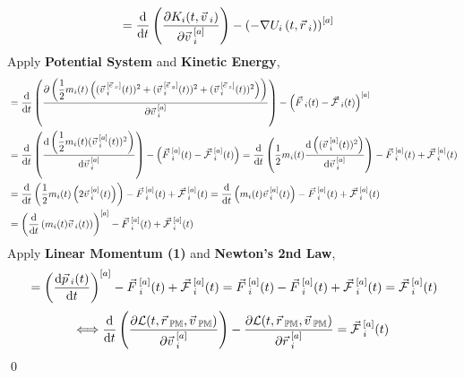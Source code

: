 \documentclass[12pt]{amsart}
\renewenvironment{proof}{{\bfseries Proof.}}{\qed}
\let\oldvec\vec
\renewcommand{\vec}[1]{\oldvec{#1}\hspace{0.1em}}
\begin{document}
\begin{proof}
\begin{align*}
& = \dfrac{\mathrm{d}}{\mathrm{d} t} \left ( \dfrac{\partial K_i (t, \vec{v}_i)}{\partial \vec{v}^{[a]}_i} \right ) - \left ( - \nabla U_i \left ( t, \vec{r}_i \right ) \right )^{[a]}
\end{align*}
Apply \textbf{Potential System} and \textbf{Kinetic Energy},
\begin{align*}
& = \dfrac{\mathrm{d}}{\mathrm{d} t} \left ( \dfrac{\partial \left ( \dfrac{1}{2} m_i (t) \left ( (\vec{v}_i^{[\vec{e}_{x}]}(t))^2+ (\vec{v}_i^{[\vec{e}_{y}]}(t))^2+ (\vec{v}_i^{[\vec{e}_{z}]}(t))^2 \right ) \right )}{\partial \vec{v}^{[a]}_i}  \right ) - \left (\vec{F}_i (t) - \vec{\mathcal{F}}_i (t) \right )^{[a]}  \\
& = \dfrac{\mathrm{d}}{\mathrm{d} t} \left ( \dfrac{\mathrm{d} \left ( \dfrac{1}{2} m_i (t) (\vec{v}_i^{[a]} (t))^2 \right )}{\mathrm{d} \vec{v}_i^{[a]}}  \right ) - \left (\vec{F}^{[a]}_i (t) - \vec{\mathcal{F}}^{[a]}_i (t)\right ) = \dfrac{\mathrm{d}}{\mathrm{d} t} \left ( \dfrac{1}{2} m_i (t) \dfrac{\mathrm{d} \left ( (\vec{v}_i^{[a]} (t))^2 \right )}{\mathrm{d} \vec{v}_i^{[a]}}  \right ) - \vec{F}^{[a]}_i (t) + \vec{\mathcal{F}}^{[a]}_i (t)  \\
& = \dfrac{\mathrm{d}}{\mathrm{d} t} \left ( \dfrac{1}{2} m_i (t) \left ( 2 \vec{v}_i^{[a]}(t) \right )  \right ) - \vec{F}^{[a]}_i (t) + \vec{\mathcal{F}}^{[a]}_i (t)= \dfrac{\mathrm{d}}{\mathrm{d} t} \left (  m_i (t)  \vec{v}_i^{[a]}(t) \right ) - \vec{F}^{[a]}_i (t) + \vec{\mathcal{F}}^{[a]}_i (t)  \\
& = \left ( \dfrac{\mathrm{d}}{\mathrm{d} t} \left (  m_i (t)  \vec{v}_i (t) \right ) \right )^{[a]} - \vec{F}^{[a]}_i (t) + \vec{\mathcal{F}}^{[a]}_i (t)  \\
    \end{align*}
Apply \textbf{Linear Momentum (1)} and \textbf{Newton's 2nd Law},
    \begin{align*}
& = \left ( \dfrac{\mathrm{d} \vec{p}_i (t)}{\mathrm{d} t} \right )^{[a]} - \vec{F}^{[a]}_i (t) + \vec{\mathcal{F}}^{[a]}_i (t) = \vec{F}_i^{[a]} (t) - \vec{F}^{[a]}_i (t) + \vec{\mathcal{F}}^{[a]}_i (t) = \vec{\mathcal{F}}^{[a]}_i (t) \\
    \end{align*}
    $$\Longleftrightarrow  \dfrac{\mathrm{d}}{\mathrm{d}  t} \left ( \dfrac{\partial \mathcal{L} (t, \vec{r}_\mathbb{PM}, \vec{v}_\mathbb{PM})}{\partial \vec{v}^{[a]}_i}  \right ) - \dfrac{\partial \mathcal{L} (t, \vec{r}_\mathbb{PM}, \vec{v}_\mathbb{PM})}{\partial \vec{r}^{[a]}_i } = \vec{\mathcal{F}}^{[a]}_i (t)$$
\end{proof}
\end{document}
